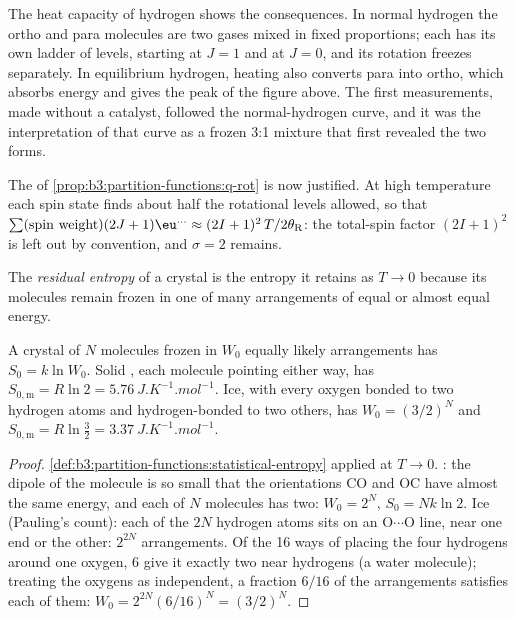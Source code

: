 The heat capacity of hydrogen shows the consequences. In normal hydrogen the
ortho and para molecules are two gases mixed in fixed proportions; each has its
own ladder of levels, starting at $J = 1$ and at $J = 0$, and its rotation freezes
separately. In equilibrium hydrogen, heating also converts para into ortho, which
absorbs energy and gives the peak of the figure above. The first measurements,
made without a catalyst, followed the normal-hydrogen curve, and it was the
interpretation of that curve as a frozen 3:1 mixture that first revealed the
two forms.

\begin{remark}
The  of \cref{prop:b3:partition-functions:q-rot} is now justified.
At high temperature each spin state finds about half the rotational levels
allowed, so that $\sum(\text{spin weight})(2J+1)\eu^{\dots} \approx (2I+1)^2\,T/2\theta_{\mathrm R}$: the
total-spin factor $(2I+1)^2$ is left out by convention, and $\sigma = 2$ remains.
\end{remark}

\begin{definition}\label{def:b3:statistical-thermo-applied:residual-entropy}
The \emph{residual entropy} of a crystal is the entropy it
retains as $T \to 0$ because its molecules remain frozen in one of many
arrangements of equal or almost equal energy.
\end{definition}

\begin{proposition}\label{prop:b3:statistical-thermo-applied:residual}
A crystal of $N$ molecules frozen in $W_0$ equally likely arrangements has $S_0 =
k\ln W_0$. Solid , each molecule pointing either way, has $S_{0,\mathrm m} = R\ln2 =
\qty{5.76}{J.K^{-1}.mol^{-1}}$. Ice, with every oxygen bonded to two hydrogen atoms
and hydrogen-bonded to two others, has $W_0 = (3/2)^N$ and $S_{0,\mathrm m} = R\ln\frac32 =
\qty{3.37}{J.K^{-1}.mol^{-1}}$.
\end{proposition}

\begin{proof}
\cref{def:b3:partition-functions:statistical-entropy} applied at $T \to 0$.
: the dipole of the molecule is so small that the orientations CO and OC
have almost the same energy, and each of $N$ molecules has two: $W_0 = 2^N$,
$S_0 = Nk\ln2$. Ice (Pauling's count): each of the $2N$ hydrogen atoms sits on an
O$\cdots$O line, near one end or the other: $2^{2N}$ arrangements. Of the 16 ways of
placing the four hydrogens around one oxygen, 6 give it exactly two near
hydrogens (a water molecule); treating the oxygens as independent, a fraction
$6/16$ of the arrangements satisfies each of them: $W_0 = 2^{2N}(6/16)^N = (3/2)^N$.
\end{proof}

